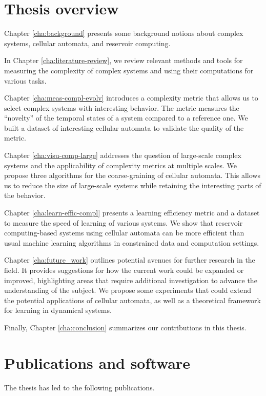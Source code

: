 \section{Thesis overview}


Chapter \ref{cha:background} presents some background notions about complex
systems, cellular automata, and reservoir computing.

In Chapter \ref{cha:literature-review}, we review relevant methods and tools for
measuring the complexity of complex systems and using their computations for
various tasks.

Chapter \ref{cha:meas-compl-evolv} introduces a complexity metric that allows us 
to select complex systems with interesting behavior. The metric measures the
``novelty'' of the temporal states of a system compared to a reference one. We
built a dataset of interesting cellular automata to validate the quality of the
metric.

Chapter \ref{cha:visu-comp-large} addresses the question of large-scale complex
systems and the applicability of complexity metrics at multiple scales. We
propose three algorithms for the coarse-graining of cellular automata. This allows
us to reduce the size of large-scale systems while retaining the interesting parts
of the behavior.

Chapter \ref{cha:learn-effic-compl} presents a learning efficiency metric and a
dataset to measure the speed of learning of various systems. We show that
reservoir computing-based systems using cellular automata can be more efficient
than usual machine learning algorithms in constrained data and computation
settings.

Chapter \ref{cha:future_work} outlines potential avenues for further research in 
the field. It provides suggestions for how the current work could be expanded or 
improved, highlighting areas that require additional investigation to advance the 
understanding of the subject. We propose some experiments that could extend the 
potential applications of cellular automata, as well as a theoretical framework 
for learning in dynamical systems.

Finally, Chapter \ref{cha:conclusion} summarizes our contributions in this thesis. 

\section{Publications and software}

The thesis has led to the following publications.

